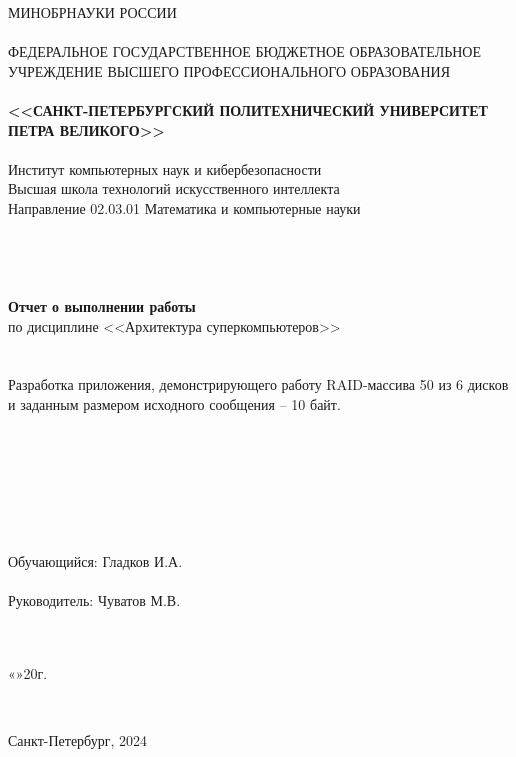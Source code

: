 \documentclass[10pt,a4paper,final]{article} %
\begin{document}
\thispagestyle{empty}

\begin{center}
	{\Large МИНОБРНАУКИ РОССИИ}\\
	~\\
	{\large ФЕДЕРАЛЬНОЕ ГОСУДАРСТВЕННОЕ БЮДЖЕТНОЕ ОБРАЗОВАТЕЛЬНОЕ УЧРЕЖДЕНИЕ ВЫСШЕГО ПРОФЕССИОНАЛЬНОГО ОБРАЗОВАНИЯ}\\
	~\\
	{\Large \bf <<САНКТ-ПЕТЕРБУРГСКИЙ ПОЛИТЕХНИЧЕСКИЙ УНИВЕРСИТЕТ ПЕТРА ВЕЛИКОГО>>}\\
	~\\
	{\large Институт компьютерных наук и кибербезопасности}\\
	{\large Высшая школа технологий искусственного интеллекта}\\
	{\large Направление 02.03.01 Математика и компьютерные науки}\\
	~\\
	~\\
	~\\
	~\\
	{\Large \bf Отчет о выполнении работы}\\
	{\Large по дисциплине <<Архитектура суперкомпьютеров>> }\\
	~\\
	~\\
	
	{\Large Разработка приложения, демонстрирующего работу RAID-массива 50 из 6 дисков и заданным размером исходного сообщения -- 10 байт.}\\
	~\\
	~\\
	~\\
	~\\
	~\\
	~\\
	~\\
	{\large Обучающийся: \underline{\hspace{3.5cm}} \qquad\qquad Гладков И.А.}\\
	~\\
	{\large Руководитель: \underline{\hspace{3.5cm}} \hspace{14mm} Чуватов М.В.}\\
	~\\
	~\\
\end{center}
\begin{flushright}
	
	«\underline{\hspace{1cm}}»\underline{\hspace{3cm}}20\underline{\hspace{0.7cm}}г.
\end{flushright}
~\\
\begin{center}
	{\large Санкт-Петербург, 2024}
\end{center}
\newpage
\end{document}
